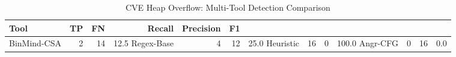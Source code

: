 \begin{table}[htbp]
\centering
\caption{CVE Heap Overflow: Multi-Tool Detection Comparison}
\label{tab:cve-multi-tool}
\begin{tabular}{lrrrrr}
\toprule
Tool & TP & FN & Recall & Precision & F1 \\
\midrule
BinMind-CSA & 2 & 14 & 12.5%
Regex-Base & 4 & 12 & 25.0%
Heuristic & 16 & 0 & 100.0%
Angr-CFG & 0 & 16 & 0.0%
\bottomrule
\end{tabular}
\end{table}
